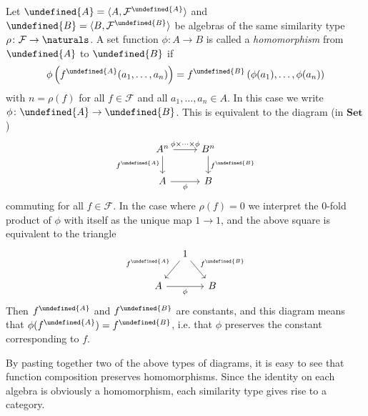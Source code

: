 \documentclass[article, a4paper, 11pt, oneside]{memoir}
\let\mathfrak\undefined
\numberwithin{equation}{chapter}
\newcommand{\calF}{\mathcal{F}}
\newcommand{\frakA}{\mathfrak{A}}
\newcommand{\frakB}{\mathfrak{B}}
\newcommand{\ncat}[1]{\mathbf{#1}} %
\newcommand{\catSet}{\ncat{Set}} %
\theoremstyle{nonumberplain}
\begin{document}
\begin{remarkbreak}
    Let $\frakA = \langle A, \calF^\frakA \rangle$ and $\frakB = \langle B, \calF^\frakB \rangle$ be algebras of the same similarity type $\rho \colon \calF \to \naturals$. A set function $\phi \colon A \to B$ is called a \emph{homomorphism} from $\frakA$ to $\frakB$ if
    \begin{equation*}
        \phi \left( f^\frakA(a_1, \ldots, a_n) \right)
            = f^\frakB \left( \phi(a_1), \ldots, \phi(a_n) \right)
    \end{equation*}
    with $n = \rho(f)$ for all $f \in \calF$ and all $a_1, \ldots, a_n \in A$. In this case we write $\phi \colon \frakA \to \frakB$. This is equivalent to the diagram (in $\catSet$)
    \begin{equation*}
        \begin{tikzcd}
            A^n
                \ar[r, "\phi \times \cdots \times \phi"]
                \ar[d, "f^\frakA", swap]
            & B^n
                \ar[d, "f^\frakB"] \\
            A
                \ar[r, "\phi", swap]
            & B
        \end{tikzcd}
    \end{equation*}
    commuting for all $f \in \calF$. In the case where $\rho(f) = 0$ we interpret the $0$-fold product of $\phi$ with itself as the unique map $1 \to 1$, and the above square is equivalent to the triangle
    \begin{equation*}
        \begin{tikzcd}[column sep=small]
            & 1
                \ar[dl, "f^\frakA", swap]
                \ar[dr, "f^\frakB"] \\
            A
                \ar[rr, "\phi", swap]
            && B
        \end{tikzcd}
    \end{equation*}
    Then $f^\frakA$ and $f^\frakB$ are constants, and this diagram means that $\phi(f^\frakA) = f^\frakB$, i.e. that $\phi$ preserves the constant corresponding to $f$.

    By pasting together two of the above types of diagrams, it is easy to see that function composition preserves homomorphisms. Since the identity on each algebra is obviously a homomorphism, each similarity type gives rise to a category.
\end{remarkbreak}
\end{document}
